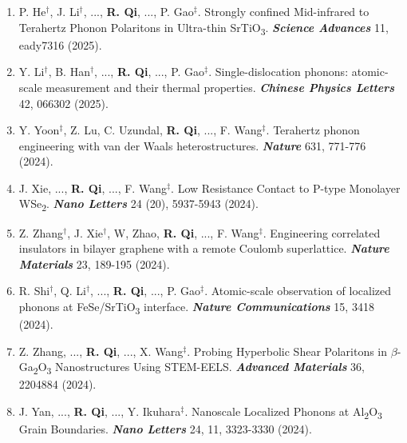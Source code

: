 \documentclass[11pt,sans]{moderncv}
\newcommand{\myemph}[1]{\textbf{\textit{#1}}}
\newcommand{\myname}[1]{\textbf{#1}}
\newcommand{\mylink}[1]{\href{#1}{\color{mycolor}\faLink}}
\begin{document}
\begin{enumerate}[topsep=2pt,itemsep=1ex,partopsep=1ex,parsep=1ex,leftmargin=6.35em,resume]
	\item P. He$^\dag$, J. Li$^\dag$, ..., \myname{R. Qi}, ..., P. Gao$^\ddag$.
	Strongly confined Mid-infrared to Terahertz Phonon Polaritons in Ultra-thin SrTiO\textsubscript{3}.
	\myemph{Science Advances} 11, eady7316 (2025).	
	\mylink{https://www.science.org/doi/10.1126/sciadv.ady7316}

	\item Y. Li$^\dag$, B. Han$^\dag$, ..., \myname{R. Qi}, ..., P. Gao$^\ddag$.
	Single-dislocation phonons: atomic-scale measurement and their thermal properties.
	\myemph{Chinese Physics Letters} 42, 066302 (2025). 
	\mylink{https://iopscience.iop.org/article/10.1088/0256-307X/42/6/066302}

	\item Y. Yoon$^\ddag$, Z. Lu, C. Uzundal, \myname{R. Qi}, ..., F. Wang$^\ddag$.
	Terahertz phonon engineering with van der Waals heterostructures. \myemph{Nature} 631, 771-776 (2024).
	\mylink{https://www.nature.com/articles/s41586-024-07604-9}

	\item J. Xie,  ..., \myname{R. Qi}, ..., F. Wang$^\ddag$.
	Low Resistance Contact to P-type Monolayer WSe\textsubscript{2}. 
	\myemph{Nano Letters} 24 (20), 5937-5943 (2024).
	\mylink{https://pubs.acs.org/doi/10.1021/acs.nanolett.3c04195}

	\item Z. Zhang$^\dag$, J. Xie$^\dag$, W, Zhao, \myname{R. Qi}, ..., F. Wang$^\ddag$.
	Engineering correlated insulators in bilayer graphene with a remote Coulomb superlattice.
	\myemph{Nature Materials} 23, 189-195 (2024).
	\mylink{https://www.nature.com/articles/s41563-023-01754-3}

	\item R. Shi$^\dag$, Q. Li$^\dag$, ..., \myname{R. Qi}, ..., P. Gao$^\ddag$.
	Atomic-scale observation of localized phonons at FeSe/SrTiO\textsubscript{3} interface.
	\myemph{Nature Communications} 15, 3418 (2024).
	\mylink{https://www.nature.com/articles/s41467-024-47688-5}

	\item Z. Zhang, ..., \myname{R. Qi}, ..., X. Wang$^\ddag$.
	Probing Hyperbolic Shear Polaritons in $\beta$-Ga\textsubscript{2}O\textsubscript{3} Nanostructures Using STEM-EELS.
	\myemph{Advanced Materials} 36, 2204884 (2024).
	\mylink{https://onlinelibrary.wiley.com/doi/full/10.1002/adma.202204884}
	
	\item J. Yan, ..., \myname{R. Qi}, ..., Y. Ikuhara$^\ddag$.
	Nanoscale Localized Phonons at Al\textsubscript{2}O\textsubscript{3} Grain Boundaries.
	\myemph{Nano Letters} 24, 11, 3323-3330 (2024).
	\mylink{https://pubs.acs.org/doi/10.1021/acs.nanolett.3c04149}


\end{enumerate}
\end{document}
